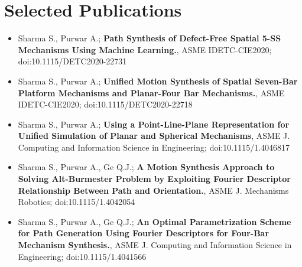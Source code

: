 \documentclass[letterpaper,10pt]{article}
\newcommand{\resumeSection}[1]{
\vspace{-12pt}
\section{\textbf{#1}}
}
\newcommand{\resumeItemListStart}{
\vspace{-7pt}
\begin{itemize}[leftmargin=14pt]
}
\newcommand{\resumeItemListEnd}{
\vspace{+7pt}
\end{itemize}
}
\newcommand{\resumeItem}[1]{
  \item\small{
      {#1 \vspace{-7pt}
      }
  }
}
\begin{document}
    
    
\resumeSection{Selected Publications}
\vspace{+7pt}
\resumeItemListStart
\resumeItem{Sharma S., Purwar A.; \textbf{Path Synthesis of Defect-Free Spatial 5-SS Mechanisms Using Machine Learning.}, ASME IDETC-CIE2020; doi:10.1115/DETC2020-22731}
\resumeItem{Sharma S., Purwar A.; \textbf{Unified Motion Synthesis of Spatial Seven-Bar Platform Mechanisms and Planar-Four Bar Mechanisms.}, ASME IDETC-CIE2020; doi:10.1115/DETC2020-22718}
\resumeItem{Sharma S., Purwar A.; \textbf{Using a Point-Line-Plane Representation for Unified Simulation of Planar and Spherical Mechanisms}, ASME J. Computing and Information Science in Engineering; doi:10.1115/1.4046817}
\resumeItem{Sharma S., Purwar A., Ge Q.J.; \textbf{A Motion Synthesis Approach to Solving Alt-Burmester Problem by Exploiting Fourier Descriptor Relationship Between Path and Orientation.}, ASME J. Mechanisms Robotics; doi:10.1115/1.4042054}
\resumeItem{Sharma S., Purwar A., Ge Q.J.; \textbf{An Optimal Parametrization Scheme for Path Generation Using Fourier Descriptors for Four-Bar Mechanism Synthesis.}, ASME J. Computing and Information Science in Engineering; doi:10.1115/1.4041566}
\resumeItemListEnd
\end{document}
